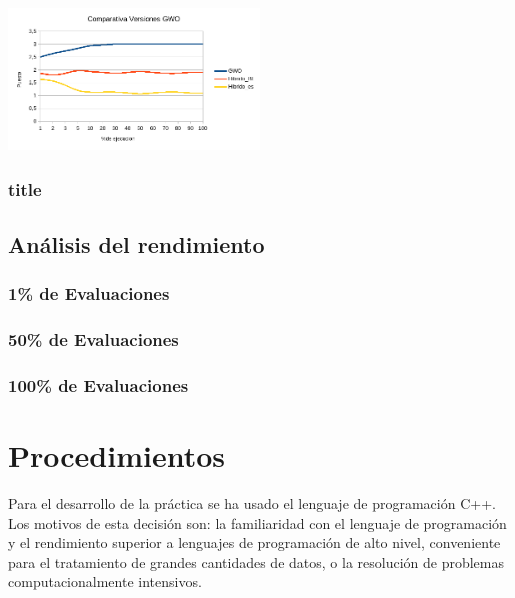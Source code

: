 \documentclass[a4paper, 12.5pt]{report}
\begin{document}
\includegraphics*[width=0.5\textwidth]{Resultados/hibrido/Interno/D30/media_posicion.png} \label{img:media_posicion_D30_comparativa}



\subsubsection*{title}



\subsection{Análisis del rendimiento}

\subsubsection{1\% de Evaluaciones}

\subsubsection{50\% de Evaluaciones}

\subsubsection{100\% de Evaluaciones}


\section{Procedimientos}

Para el desarrollo de la práctica se ha usado el lenguaje de programación C++. Los motivos de esta decisión son: la familiaridad con el lenguaje de programación y el rendimiento superior a lenguajes de programación de alto nivel, conveniente para el tratamiento de grandes cantidades de datos, o la resolución de problemas computacionalmente intensivos.
\end{document}
